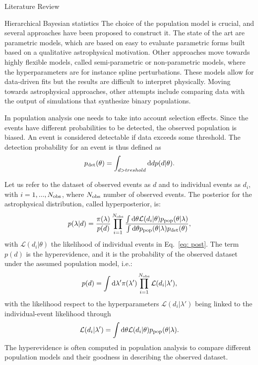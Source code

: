 \documentclass[a4paper, 12pt, twoside, openright, titlepage]{book}
\begin{document}
\begin{chapter}{Literature Review}
\begin{section}{Hierarchical Bayesian statistics}
The choice of the population model is crucial, and several approaches have been proposed to construct it.
The state of the art are parametric models, which are based on easy to evaluate parametric forms built based on a qualitative astrophysical motivation.
Other approaches move towards highly flexible models, called semi-parametric or non-parametric models, where the hyperparameters are for instance spline perturbations. These models allow for data-driven fits but the results are difficult to interpret physically.
Moving towards astrophysical approaches, other attempts include comparing data with the output of simulations that synthesize binary populations.

In population analysis one needs to take into account selection effects.
Since the events have different probabilities to be detected, the observed population is biased.
An event is considered detectable if data exceeds some threshold.
The detection probability for an event is thus defined as
\begin{equation}
p_{\rm det}(\theta) = \int_{d>treshold} \textrm{d}d p(d|\theta).
\end{equation}

Let us refer to the dataset of observed events as $d$ and to individual events as $d_{i}$, with $i=1, ..., N_{\rm obs}$, where $N_{\rm obs}$ number of observed events.
The posterior for the astrophysical distribution, called hyperposterior, is:
\begin{equation}
\label{eq: hyperpost}
p(\lambda|d) = \frac{\pi(\lambda)}{p(d)} \prod_{i=1}^{N_{\rm obs}}\frac{\int \textrm{d}\theta \mathcal{L}(d_{i}|\theta)p_{\rm pop}(\theta|\lambda)}{\int \textrm{d}\theta p_{\rm pop}(\theta|\lambda)p_{\rm det}(\theta)},
\end{equation}
with $\mathcal{L}(d_{i}|\theta)$ the likelihood of individual events in Eq.~\ref{eq: post}.
The term $p(d)$ is the hyperevidence, and it is the probability of the observed dataset under the assumed population model, i.e.:
\begin{equation}
p(d)=\int \textrm{d}\lambda'  \pi(\lambda') \prod_{i=1}^{N_{\rm obs}} \mathcal{L}(d_{i}|\lambda'),
\end{equation}
with the likelihood respect to the hyperparameters $\mathcal{L}(d_{i}|\lambda')$ being linked to the individual-event likelihood through
\begin{equation}
\mathcal{L}(d_{i}|\lambda') = \int \textrm{d}\theta\mathcal{L}(d_{i}|\theta)p_{\rm pop}(\theta|\lambda).
\end{equation}
The hyperevidence is often computed in population analysis to compare different population models and their goodness in describing the observed dataset. 


\end{section}
\end{chapter}
\end{document}
